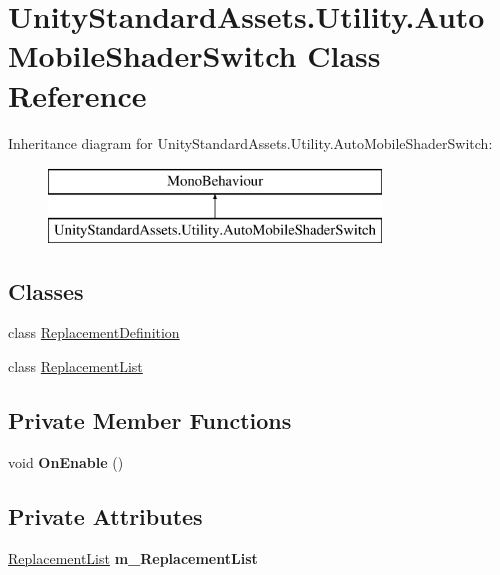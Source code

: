 \hypertarget{class_unity_standard_assets_1_1_utility_1_1_auto_mobile_shader_switch}{}\section{Unity\+Standard\+Assets.\+Utility.\+Auto\+Mobile\+Shader\+Switch Class Reference}
\label{class_unity_standard_assets_1_1_utility_1_1_auto_mobile_shader_switch}
Inheritance diagram for Unity\+Standard\+Assets.\+Utility.\+Auto\+Mobile\+Shader\+Switch\+:\begin{figure}[H]
\begin{center}
\leavevmode
\includegraphics[height=2.000000cm]{class_unity_standard_assets_1_1_utility_1_1_auto_mobile_shader_switch}
\end{center}
\end{figure}
\subsection*{Classes}
\begin{DoxyCompactItemize}
\item 
class \hyperlink{class_unity_standard_assets_1_1_utility_1_1_auto_mobile_shader_switch_1_1_replacement_definition}{Replacement\+Definition}
\item 
class \hyperlink{class_unity_standard_assets_1_1_utility_1_1_auto_mobile_shader_switch_1_1_replacement_list}{Replacement\+List}
\end{DoxyCompactItemize}
\subsection*{Private Member Functions}
\begin{DoxyCompactItemize}
\item 
\mbox{\label{class_unity_standard_assets_1_1_utility_1_1_auto_mobile_shader_switch_afa51b6506ec7fb188f84cd857baeadb5}} 
void {\bfseries On\+Enable} ()
\end{DoxyCompactItemize}
\subsection*{Private Attributes}
\begin{DoxyCompactItemize}
\item 
\mbox{\label{class_unity_standard_assets_1_1_utility_1_1_auto_mobile_shader_switch_a384b149e2c1890c97f906efcd884c48c}} 
\hyperlink{class_unity_standard_assets_1_1_utility_1_1_auto_mobile_shader_switch_1_1_replacement_list}{Replacement\+List} {\bfseries m\+\_\+\+Replacement\+List}
\end{DoxyCompactItemize}


